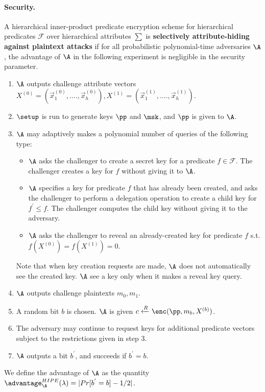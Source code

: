 \documentclass[11pt,hidelinks]{article}
\begin{document}
\begin{appendix}
\paragraph{Security.} A hierarchical inner-product predicate encryption scheme for hierarchical predicates $\mathcal{F}$ over hierarchical attributes $\sum$ is \textbf{selectively attribute-hiding against plaintext attacks} if for all probabilistic polynomial-time adversaries $\A$, the advantage of $\A$ in the following experiment is negligible in the security parameter.
\begin{enumerate}
\item $\A$ outputs challenge attribute vectors $X^{(0)}=(\overrightarrow{x}^{(0)}_{1},....,\overrightarrow{x}^{(0)}_{h}), X^{(1)}=(\overrightarrow{x}^{(1)}_{1},....,\overrightarrow{x}^{(1)}_{h})$.
\item $\setup$ is run to generate keys $\pp$ and $\msk$, and $\pp$ is given to $\A$.
\item $\A$ may adaptively makes a polynomial number of queries of the following type:
 \begin{itemize}
 \item $\A$ asks the challenger to create a secret key for a predicate $f \in \mathcal{F}$. The challenger creates a key for $f$ without giving it to $\A$.
 \item $\A$ specifies a key for predicate $f$ that has already been created, and asks the challenger to perform a delegation operation to create a child key for $f^{'} \leq f$. The challenger computes the child key without giving it to the adversary.
 \item $\A$ asks the challenger to reveal an already-created key for predicate $f$ s.t. $f(X^{(0)})=f(X^{(1)})=0$.
 \end{itemize}
 Note that when key creation requests are made, $\A$ does not automatically see the created key. $\A$ see a key only when it makes a reveal key query.
\item $\A$ outputs challenge plaintexts $m_{0},m_{1}$.
\item A random bit $b$ is chosen. $\A$ is given $c\xleftarrow{R} \enc(\pp, m_{b}, X^{(b)})$.
\item The adversary may continue to request keys for additional predicate vectors subject to the restrictions given in step 3.
\item $\A$ outputs a bit $b^{'}$, and succeeds if $b^{'}=b$.
\end{enumerate}
We define the advantage of $\A$ as the quantity $\advantage^{HIPE}_{\A}(\lambda)=|Pr[b^{'}=b]-1/2|$.

\end{appendix}
\end{document}
